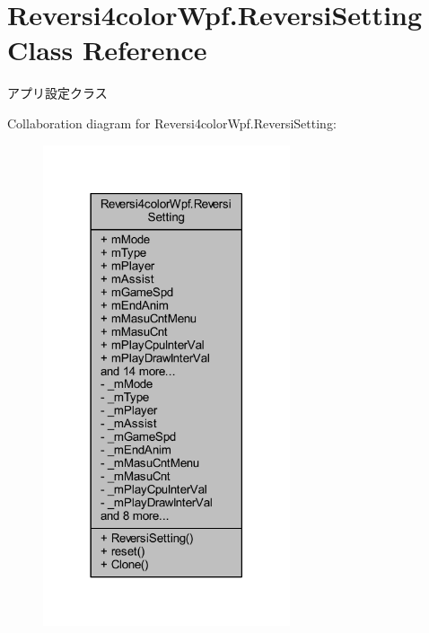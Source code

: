 \hypertarget{class_reversi4color_wpf_1_1_reversi_setting}{}\section{Reversi4color\+Wpf.\+Reversi\+Setting Class Reference}
\label{class_reversi4color_wpf_1_1_reversi_setting}


アプリ設定クラス  




Collaboration diagram for Reversi4color\+Wpf.\+Reversi\+Setting\+:\nopagebreak
\begin{figure}[H]
\begin{center}
\leavevmode
\includegraphics[width=206pt]{class_reversi4color_wpf_1_1_reversi_setting__coll__graph}
\end{center}
\end{figure}
